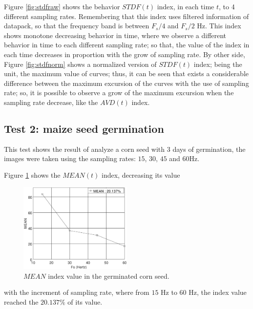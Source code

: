 \documentclass[review]{elsarticle}
\begin{document}
Figure \ref{fig:stdfraw} shows the behavior $STDF(t)$ index, in each time $t$, 
to 4 different sampling rates. Remembering that this index uses filtered 
information of datapack, so that the frequency
band is between $F_s/4$ and $F_s/2$ Hz. 
This index shows monotone decreasing behavior in time, where we observe 
a different behavior in time to each different sampling rate;
so that, the value of the index in each time decreases in proportion with 
the grow of sampling rate. By other side,
Figure \ref{fig:stdfnorm} shows a normalized version of $STDF(t)$ index;
being the unit, the maximum value of curves; thus,
it can be seen that exists a considerable difference between the maximum excursion 
of the curves with the use of sampling rate; so, it is possible to observe a 
grow of the maximum excursion when the sampling rate decrease, like the $AVD(t)$ index.

\subsection{Test 2: maize seed germination}
\label{subsec:resulttest2}

This test shows the result of analyze a corn seed  with 3 days of germination,
the images were taken using the sampling rates: $15$, $30$, $45$ and $60$Hz.

Figure \ref{fig:MEANtest2} shows the $MEAN(t)$ index,
decreasing its value
\begin{figure}[ht!]
    \centering
    \includegraphics[width=0.5\textwidth]{FPS_Semilla_3_3diasALLMEAN.eps}
    \caption{$MEAN$ index value in the germinated corn seed.}\label{fig:MEANtest2}
\end{figure}
with the increment of sampling rate, %
where from %
$15$ Hz to $60$ Hz, the index value reached the $20.137\%$ of its value.
\end{document}
